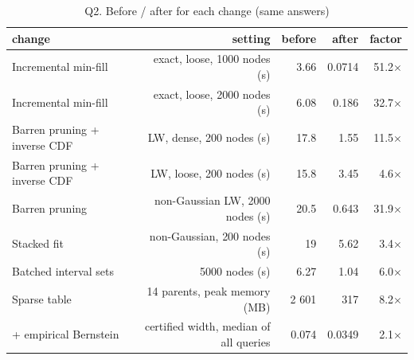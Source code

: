 \begin{table}[H]\centering\small
\caption{Q2. Before / after for each change (same answers)}\label{tab:q2}

\begin{tabular}{lrrrr}\toprule
change & setting & before & after & factor \\ \midrule
Incremental min-fill & exact, loose, 1000 nodes (s) & 3.66 & 0.0714 & 51.2$\times$ \\
Incremental min-fill & exact, loose, 2000 nodes (s) & 6.08 & 0.186 & 32.7$\times$ \\
Barren pruning + inverse CDF & LW, dense, 200 nodes (s) & 17.8 & 1.55 & 11.5$\times$ \\
Barren pruning + inverse CDF & LW, loose, 200 nodes (s) & 15.8 & 3.45 & 4.6$\times$ \\
Barren pruning & non-Gaussian LW, 2000 nodes (s) & 20.5 & 0.643 & 31.9$\times$ \\
Stacked fit & non-Gaussian, 200 nodes (s) & 19 & 5.62 & 3.4$\times$ \\
Batched interval sets & 5000 nodes (s) & 6.27 & 1.04 & 6.0$\times$ \\
Sparse table & 14 parents, peak memory (MB) & 2 601 & 317 & 8.2$\times$ \\
+ empirical Bernstein & certified width, median of all queries & 0.074 & 0.0349 & 2.1$\times$ \\
\bottomrule\end{tabular}
\end{table}

